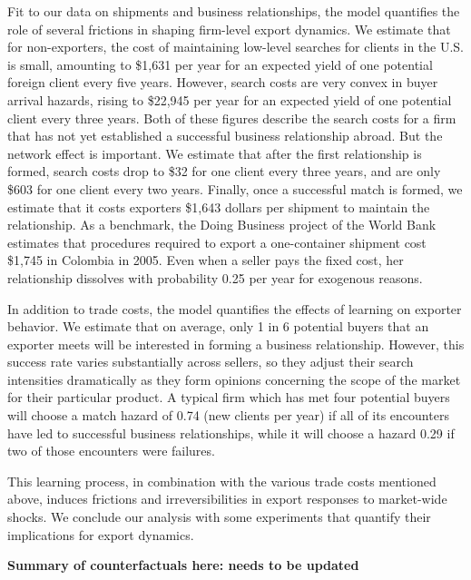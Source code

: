 \documentclass[12pt,titlepage]{article}
\begin{document}
Fit to our data on shipments and business relationships, the model
quantifies the role of several frictions in shaping firm-level export
dynamics. We estimate that for non-exporters, the cost of maintaining
low-level searches for clients in the U.S. is small, amounting to \$1,631
per year for an expected yield of one potential foreign client every five years.
However, search costs are very convex in buyer arrival hazards, rising to
\$22,945 per year for an expected yield of one potential client every three years. Both of
these figures describe the search costs for a firm that has not yet
established a successful business relationship abroad. But the network effect
is important. We estimate that after the first relationship is formed,
search costs drop to \$32 for one client every three years,
and are only \$603 for one client every two years.  Finally, once a successful 
match is formed, we estimate that it costs exporters \$1,643 dollars per 
shipment to maintain the relationship. As a benchmark, the Doing Business project of the World Bank
estimates that procedures required to export a one-container shipment cost
\$1,745 in Colombia in 2005. Even when a seller pays the fixed cost, her
relationship dissolves with probability 0.25 per year for exogenous reasons.

In addition to trade costs, the model quantifies the effects of learning on
exporter behavior. We estimate that on average, only 1 in 6 potential buyers
that an exporter meets will be interested in forming a business
relationship. However, this success rate varies substantially across
sellers, so they adjust their search intensities dramatically as they form
opinions concerning the scope of the market for their particular product. A
typical firm which has met four potential buyers will choose a match hazard
of 0.74 (new clients per year) if all of its encounters have led to
successful business relationships, while it will choose a hazard 0.29 if
two of those encounters were failures.

This learning process, in combination with the various trade costs mentioned
above, induces frictions and irreversibilities in export responses to
market-wide shocks. We conclude our analysis with some experiments that
quantify their implications for export dynamics. 

\textbf{Summary of counterfactuals here: needs to be updated}
\end{document}
